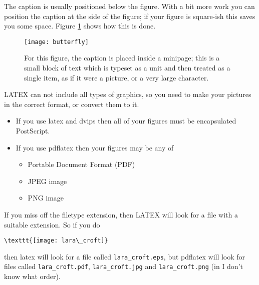 The caption is usually positioned below the figure. With a bit more work you can position the caption at the side of the figure; if your figure is square-ish this saves you some space. Figure \ref{butterflyLeft} shows how this is done. \\

\noindent\hrulefill
\begin{figure}[htbp]
  \begin{minipage}[c]{0.3\linewidth}
    \texttt{[image: butterfly]}
  \end{minipage}\hfill
  \begin{minipage}[c]{0.7\linewidth}
    \caption{For this figure, the caption is placed inside a minipage; this is a small block of text which is typeset as a unit and then treated as a single item, as if it were a picture, or a very large character.} 
    \label{butterflyLeft}
  \end{minipage}
\end{figure}
\par
\noindent\hrulefill
  
LATEX can not include all types of graphics, so you need to make your pictures in the correct format, or convert them to it.

\begin{itemize}
    \item If you use latex and dvips then all of your figures must be encapsulated PostScript.
    \item If you use pdflatex then your figures may be any of
    \begin{itemize}
        \item Portable Document Format (PDF)
        \item JPEG image
        \item PNG image
    \end{itemize}
\end{itemize}

If you miss off the filetype extension, then LATEX will look for a file with a suitable extension. So if you do 

\begin{lstlisting}
\texttt{[image: lara\_croft]}
\end{lstlisting}

then latex will look for a file called \verb|lara_croft.eps|, but pdflatex will look for files called \verb|lara_croft.pdf|, \verb|lara_croft.jpg| and \verb|lara_croft.png| (in I don’t know what order). 

